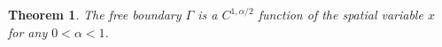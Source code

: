\documentclass{amsart}
\newtheorem{theorem}{Theorem}[section]
\numberwithin{equation}{section}
\begin{document}




\begin{theorem} \label{t:holder}
    The free boundary $\Gamma$ is a $C^{1,\alpha/2}$ function of the spatial variable $x$ for any $0<\alpha<1$. 
\end{theorem}
\end{document}
